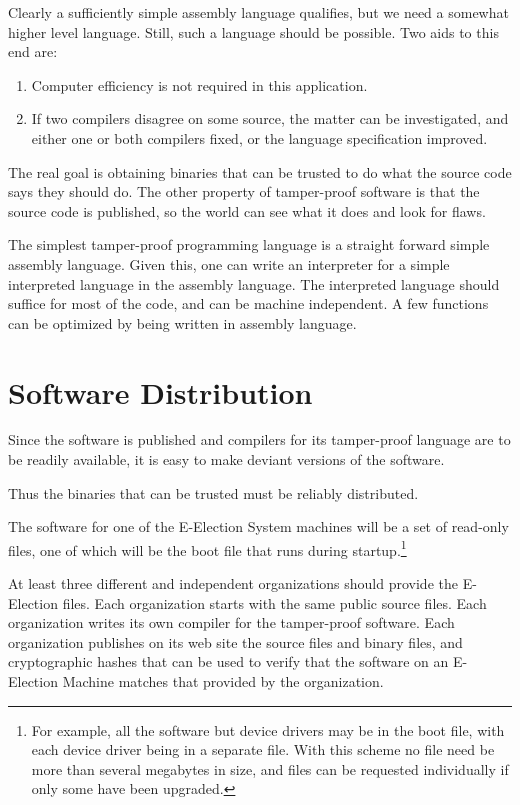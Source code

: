 \documentclass[12pt]{article}
\begin{document}
Clearly a sufficiently simple assembly language qualifies, but
we need a somewhat higher level language.  Still, such a language
should be possible.  Two aids to this end are:
\begin{enumerate}
\item
Computer efficiency is not required in this application.

\item
If two compilers disagree on some source, the matter can be
investigated, and either one or both compilers fixed, or the
language specification improved.
\end{enumerate}

The real goal is obtaining binaries that can be trusted to
do what the source code says they should do.  The other
property of tamper-proof software is that the source code
is published, so the world can see what it does and look
for flaws.

The simplest tamper-proof programming language is a straight
forward simple assembly language.  Given this, one can write
an interpreter for a simple interpreted language in the
assembly language.  The interpreted language should suffice
for most of the code, and can be machine independent.
A few functions can be optimized by being written in assembly
language.

\section{Software Distribution}\label{SOFTWARE-DISTRIBUTION}

Since the software is published and compilers for its tamper-proof
language are to be readily available, it is easy to make deviant
versions of the software.\label{DEVIANT-SOFTWARE}

Thus the binaries that can be trusted must be reliably distributed.

The software for one of the E-Election
System machines will be a set of read-only files, one of which will be
the boot file that runs during startup.\footnote{For example, all
the software but device drivers may be in the boot file, with each
device driver being in a separate file.  With this scheme no file
need be more than several megabytes in size, and files can be
requested individually if only some have been upgraded.}

At least three different and independent organizations should provide
the E-Election files.  Each organization starts with the same public
source files.  Each organization writes its own compiler for the
tamper-proof software.  Each organization publishes on its web site
the source files and binary files, and cryptographic hashes that
can be used to verify that the software on an E-Election Machine
matches that provided by the organization.
\end{document}
